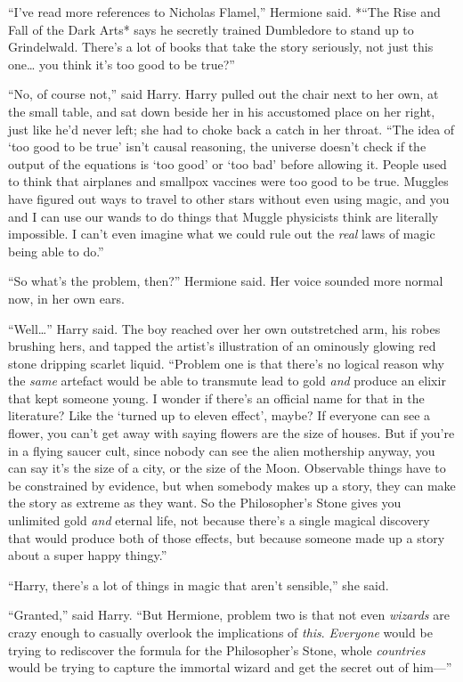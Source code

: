 ``I've read more references to Nicholas Flamel,'' Hermione said. *``The
Rise and Fall of the Dark Arts* says he secretly trained Dumbledore to
stand up to Grindelwald. There's a lot of books that take the story
seriously, not just this one\ldots{} you think it's too good to be
true?''

``No, of course not,'' said Harry. Harry pulled out the chair next to
her own, at the small table, and sat down beside her in his accustomed
place on her right, just like he'd never left; she had to choke back a
catch in her throat. ``The idea of `too good to be true' isn't causal
reasoning, the universe doesn't check if the output of the equations is
`too good' or `too bad' before allowing it. People used to think that
airplanes and smallpox vaccines were too good to be true. Muggles have
figured out ways to travel to other stars without even using magic, and
you and I can use our wands to do things that Muggle physicists think
are literally impossible. I can't even imagine what we could rule out
the \emph{real} laws of magic being able to do.''

``So what's the problem, then?'' Hermione said. Her voice sounded more
normal now, in her own ears.

``Well\ldots{}'' Harry said. The boy reached over her own outstretched
arm, his robes brushing hers, and tapped the artist's illustration of an
ominously glowing red stone dripping scarlet liquid. ``Problem one is
that there's no logical reason why the \emph{same} artefact would be
able to transmute lead to gold \emph{and} produce an elixir that kept
someone young. I wonder if there's an official name for that in the
literature? Like the `turned up to eleven effect', maybe? If everyone
can see a flower, you can't get away with saying flowers are the size of
houses. But if you're in a flying saucer cult, since nobody can see the
alien mothership anyway, you can say it's the size of a city, or the
size of the Moon. Observable things have to be constrained by evidence,
but when somebody makes up a story, they can make the story as extreme
as they want. So the Philosopher's Stone gives you unlimited gold
\emph{and} eternal life, not because there's a single magical discovery
that would produce both of those effects, but because someone made up a
story about a super happy thingy.''

``Harry, there's a lot of things in magic that aren't sensible,'' she
said.

``Granted,'' said Harry. ``But Hermione, problem two is that not even
\emph{wizards} are crazy enough to casually overlook the implications of
\emph{this}. \emph{Everyone} would be trying to rediscover the formula
for the Philosopher's Stone, whole \emph{countries} would be trying to
capture the immortal wizard and get the secret out of him---''

